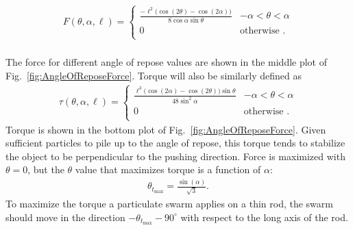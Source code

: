 \begin{align}
F(\theta,\alpha,\ell) =\left\{
\begin{array}{ll}
\frac{-\ell^2\Big(\cos(2\theta)-\cos(2\alpha)\Big)}{8\cos\alpha\sin{\theta}} &   -\alpha<\theta<\alpha\\
0 &    \textrm{otherwise .}\\
\end{array} 
\right .\\
\end{align}



The force for different angle of repose values are shown in the middle plot of Fig.~\ref{fig:AngleOfReposeForce}. 
Torque will also be similarly defined as
\begin{align}
\tau(\theta, \alpha, \ell) =\left\{
\begin{array}{ll}
\frac{\ell^3\Big(\cos(2\alpha)-\cos(2\theta)\Big)\sin{\theta} }{48\sin^2\alpha}&   -\alpha<\theta<\alpha\\
0 &    \textrm{otherwise .}\\
\end{array} 
\right.
\end{align}
Torque is shown in the bottom plot of Fig.~\ref{fig:AngleOfReposeForce}.
 Given sufficient particles to pile up to the angle of repose, this torque tends to stabilize the object to be perpendicular to the pushing direction.
Force is maximized with $\theta=0$, but the $\theta$ value that maximizes torque is a function of $\alpha$:
\begin{align}
\theta_{t_{\max}} = \frac{\sin(\alpha)}{\sqrt{3}}.
\end{align}
To maximize the torque a particulate swarm applies on a thin rod, the swarm should move in the direction $-\theta_{t_{\max}} - 90^\circ$ with respect to the long axis of the rod.



